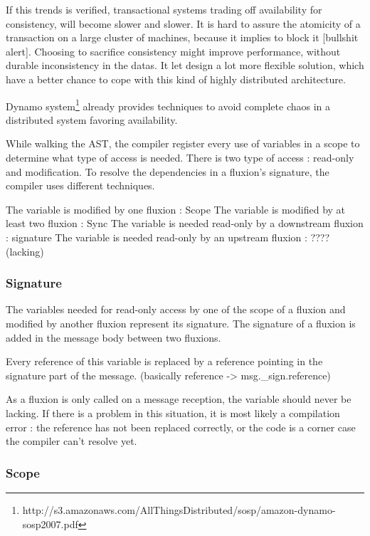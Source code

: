 If this trends is verified, transactional systems trading off availability for consistency, will become slower and slower.
It is hard to assure the atomicity of a transaction on a large cluster of machines, because it implies to block it [bullshit alert].
Choosing to sacrifice consistency might improve performance, without durable inconsistency in the datas.
It let design a lot more flexible solution, which have a better chance to cope with this kind of highly distributed architecture.


Dynamo system\footnote{http://s3.amazonaws.com/AllThingsDistributed/sosp/amazon-dynamo-sosp2007.pdf} already provides techniques to avoid complete chaos in a distributed system favoring availability.





While walking the AST, the compiler register every use of variables in a scope to determine what type of access is needed.
There is two type of access : read-only and modification.
To resolve the dependencies in a fluxion's signature, the compiler uses different techniques.

The variable is modified by one fluxion : Scope
The variable is modified by at least two fluxion : Sync
The variable is needed read-only by a downstream fluxion : signature
The variable is needed read-only by an upstream fluxion : ???? (lacking)


\subsubsection{Signature}

  The variables needed for read-only access by one of the scope of a fluxion and modified by another fluxion represent its signature.
  The signature of a fluxion is added in the message body between two fluxions.

  Every reference of this variable is replaced by a reference pointing in the signature part of the message.
  (basically reference -> msg._sign.reference)

  As a fluxion is only called on a message reception, the variable should never be lacking.
  If there is a problem in this situation, it is most likely a compilation error : the reference has not been replaced correctly, or the code is a corner case the compiler can't resolve yet.

\subsubsection{Scope}


